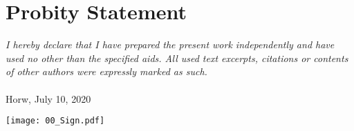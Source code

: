 \section*{Probity Statement}


\textit{I hereby declare that I have prepared the present work independently and have used no other than the specified aids. All used text excerpts, citations or contents of other authors were expressly marked as such.}
\\
\\
Horw, July 10, 2020
\\[2cm]
\begin{flushright}
    \texttt{[image: 00\_Sign.pdf]}
    \\
    \vspace{-3mm}
	\@author
\end{flushright}
